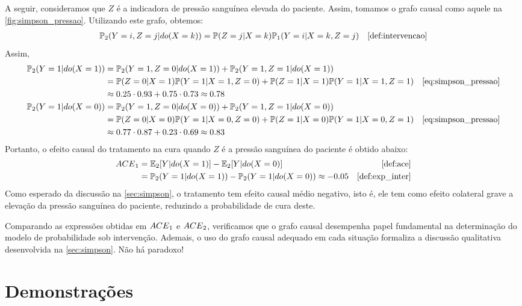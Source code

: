 \begin{example}
 A seguir, consideramos que $Z$ é
 a indicadora de pressão sanguínea elevada do paciente.
 Assim, tomamos o grafo causal como 
 aquele na \cref{fig:simpson_pressao}.
 Utilizando este grafo, obtemos:
 \begin{align}
  \label{eq:simpson_pressao}
  \P_2(Y=i,Z=j|do(X=k))
  &= \P(Z=j|X=k)\P_1(Y=i|X=k,Z=j) 
  & \text{\cref{def:intervencao}}
 \end{align}
 Assim,
 \begin{align*}
  \P_2(Y=1|do(X=1))
  &= \P_2(Y=1,Z=0|do(X=1)) + \P_2(Y=1,Z=1|do(X=1)) \\
  &= \P(Z=0|X=1)\P(Y=1|X=1,Z=0) + \P(Z=1|X=1)\P(Y=1|X=1,Z=1)
  & \text{\cref{eq:simpson_pressao}} \\
  &\approx 0.25 \cdot 0.93 + 0.75 \cdot 0.73 \approx 0.78 \\
  \P_2(Y=1|do(X=0))
  &= \P_2(Y=1,Z=0|do(X=0)) + \P_2(Y=1,Z=1|do(X=0)) \\
  &= \P(Z=0|X=0)\P(Y=1|X=0,Z=0) + \P(Z=1|X=0)\P(Y=1|X=0,Z=1)
  & \text{\cref{eq:simpson_pressao}} \\
  &\approx 0.77 \cdot 0.87 + 0.23 \cdot 0.69 \approx 0.83 \\
 \end{align*}
 Portanto, o efeito causal do tratamento na cura quando
 $Z$ é a pressão sanguínea do paciente é obtido abaixo:
 \begin{align*}
  \ACE_1 &= \E_2[Y|do(X=1)] - \E_2[Y|do(X=0)] 
  & \text{\cref{def:ace}} \\
  &= \P_2(Y=1|do(X=1)) - \P_2(Y=1|do(X=0)) \approx -0.05
  & \text{\cref{def:exp_inter}}
 \end{align*}
 Como esperado da discussão na \cref{sec:simpson},
 o tratamento tem efeito causal médio negativo, isto é,
 ele tem como efeito colateral grave a
 elevação da pressão sanguínea do paciente,
 reduzindo a probabilidade de cura deste.
 
 Comparando as expressões obtidas em ${ACE}_1$ e ${ACE}_2$,
 verificamos que o grafo causal desempenha papel fundamental
 na determinação do modelo de probabilidade sob intervenção.
 Ademais, o uso do grafo causal adequado em cada situação formaliza
 a discussão qualitativa desenvolvida na \cref{sec:simpson}.
 Não há paradoxo!
\end{example}





\appendix

\chapter{Demonstrações}

